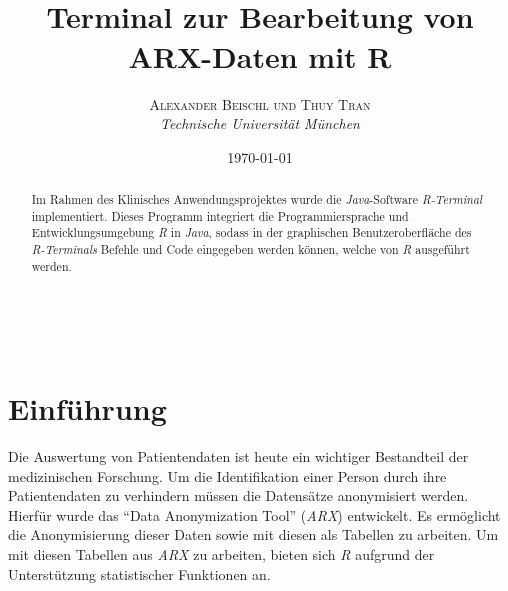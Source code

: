 \documentclass[a4paper, 12pt]{report} %
\title{\textbf{}\\ %
Terminal zur Bearbeitung von ARX-Daten mit R} %
\author{\textsc{Alexander Beischl und Thuy Tran} %
\\{\textit{Technische Universität München}}} %
\date{\today} %
\makeatletter
\renewcommand{\maketitle}{ %
\begin{flushright} %
{\LARGE\@title} %

\vspace{50pt} %

{\large\@author} %
\\\@date %

\vspace{40pt} %
\end{flushright}
}
\makeatother
\begin{document}
\renewcommand\lstlistingname{R-Befehl}

\maketitle %


\renewcommand{\abstractname}{Zusammenfassung} %

\begin{abstract}

Im Rahmen des Klinisches Anwendungsprojektes wurde die \textit{Java}-Software \textit{R-Terminal} implementiert. Dieses Programm integriert die Programmiersprache und Entwicklungsumgebung \textit{R} in \textit{Java}, sodass in der graphischen Benutzeroberfläche des \textit{R-Terminals} Befehle und Code eingegeben werden können, welche von \textit{R} ausgeführt werden. 

\end{abstract}


\vspace{30pt} %

\tableofcontents



\chapter{Einführung}\label{einführung}

Die Auswertung von Patientendaten ist heute ein wichtiger Bestandteil der medizinischen Forschung. Um die Identifikation einer Person durch ihre Patientendaten zu verhindern müssen die Datensätze anonymisiert werden.
Hierfür wurde das "`Data Anonymization Tool"' (\textit{ARX}) entwickelt. Es ermöglicht die Anonymisierung dieser Daten sowie mit diesen als Tabellen zu arbeiten.
Um mit diesen Tabellen aus \textit{ARX} zu arbeiten,  bieten sich \textit{R} aufgrund der Unterstützung statistischer Funktionen an. 
\end{document}
